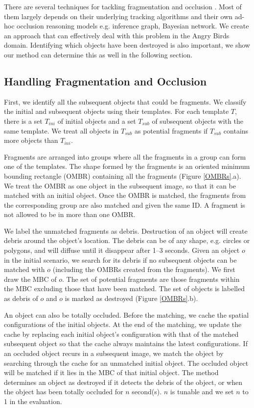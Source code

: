 \documentclass[letterpaper]{article}
\begin{document}
 There are several techniques for tackling fragmentation and occlusion \cite{Occlusion1,Occlusion2,Occlusion3}. Most of them largely depends on their underlying tracking algorithms and their own ad-hoc occlusion reasoning models e.g. inference graph, Bayesian network. We create an approach that can effectively deal with this problem in the Angry Birds domain. Identifying which objects have been destroyed is also important, we show our method can determine this as well in the following section.   

\subsection{Handling Fragmentation and Occlusion}
 
First, we identify all the subsequent objects that could be fragments. We classify the initial and subsequent objects using their templates. For each template $T$, there is a set $T_{ini}$ of initial objects and a set $T_{sub}$ of subsequent objects with the same template. We treat all objects in $T_{sub}$ as potential fragments if $T_{sub}$ contains more objects than $T_{ini}$.

Fragments are arranged into groups where all the fragments in a group can form one of the templates. The shape formed by the fragments is an oriented minimum bounding rectangle (OMBR) containing all the fragments (Figure \ref{OMBRs}.a). We treat the OMBR as one object in the subsequent image, so that it can be matched with an initial object. Once the OMBR is matched, the fragments from the corresponding group are also matched and given the same ID. A fragment is not allowed to be in more than one OMBR.

We label the unmatched fragments as debris. Destruction of an object will create debris around the object's location. The debris can be of any shape, e.g. circles or polygons, and will diffuse until it disappear after 1--3 seconds. Given an object $o$ in the initial scenario, we search for its debris if no subsequent objects can be matched with $o$ (including the OMBRs created from the fragments). We first draw the MBC of $o$. The set of potential fragments are those fragments within the MBC excluding those that have been matched. The set of objects is labelled as debris of $o$ and $o$ is marked as destroyed (Figure \ref{OMBRs}.b).

An object can also be totally occluded. Before the matching, we cache the spatial configurations of the initial objects. At the end of the matching, we update the cache by replacing each initial object's configuration with that of the matched subsequent object so that the cache always maintains the latest configurations. If an occluded object recurs in a subsequent image, we match the object by searching through the cache for an unmatched initial object. The occluded object will be matched if it lies in the MBC of that initial object. The method determines an object as destroyed if it detects the debris of the object, or when the object has been totally occluded for $n$ second(s). $n$ is tunable and we set $n$ to 1 in the evaluation.
\end{document}
